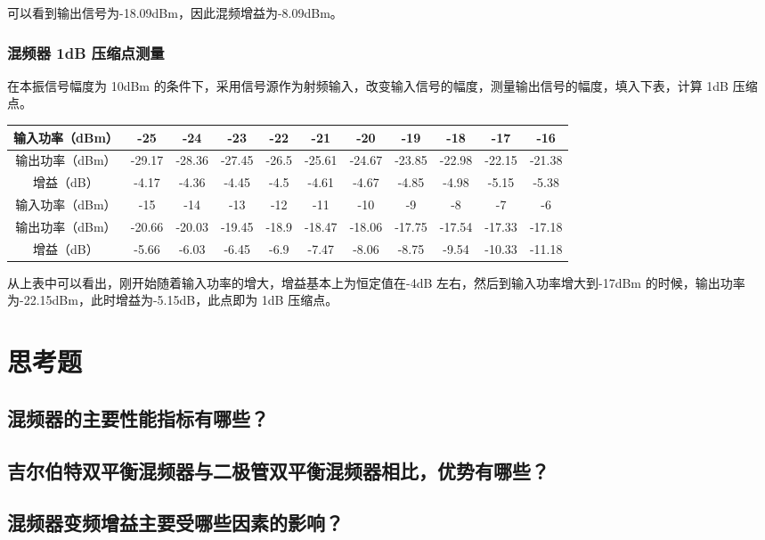 \documentclass{../source/Experiment}
\begin{document}
        可以看到输出信号为-18.09dBm，因此混频增益为-8.09dBm。

        \subsubsection{混频器 1dB 压缩点测量}
        
        在本振信号幅度为 10dBm 的条件下，采用信号源作为射频输入，改变输入信号的幅度，测量输出信号的幅度，填入下表，计算 1dB 压缩点。

        \begin{table}[H]
            \begin{tabular}{|c|c|c|c|c|c|c|c|c|c|c|}
            \hline
            输入功率（dBm） & -25    & -24    & -23    & -22   & -21    & -20    & -19    & -18    & -17    & -16    \\ \hline
            输出功率（dBm） & -29.17 & -28.36 & -27.45 & -26.5 & -25.61 & -24.67 & -23.85 & -22.98 & -22.15 & -21.38 \\ \hline
            增益（dB）    & -4.17  & -4.36  & -4.45  & -4.5  & -4.61  & -4.67  & -4.85  & -4.98  & -5.15  & -5.38  \\ \hline
            输入功率（dBm） & -15    & -14    & -13    & -12   & -11    & -10    & -9     & -8     & -7     & -6     \\ \hline
            输出功率（dBm） & -20.66 & -20.03 & -19.45 & -18.9 & -18.47 & -18.06 & -17.75 & -17.54 & -17.33 & -17.18 \\ \hline
            增益（dB）    & -5.66  & -6.03  & -6.45  & -6.9  & -7.47  & -8.06  & -8.75  & -9.54  & -10.33 & -11.18 \\ \hline
            \end{tabular}
        \end{table}

        从上表中可以看出，刚开始随着输入功率的增大，增益基本上为恒定值在-4dB 左右，然后到输入功率增大到-17dBm 的时候，输出功率为-22.15dBm，此时增益为-5.15dB，此点即为 1dB 压缩点。
    \section{思考题}
	    \subsection{混频器的主要性能指标有哪些？}
        
        \subsection{吉尔伯特双平衡混频器与二极管双平衡混频器相比，优势有哪些？}

        \subsection{混频器变频增益主要受哪些因素的影响？}
	
\end{document}
